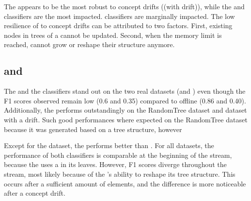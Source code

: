 
The \hoeffdingtree appears to be the most robust to concept drifts
(\banosdataset (with drift)), while the \mondrianforest and \naivebayes
classifiers are the most impacted. \mcnn classifiers are marginally impacted.
The low resilience of \mondrianforest to concept drifts can be attributed to
two factors. First, existing nodes in trees of a \mondrianforest cannot be updated.
Second, when the memory limit is reached, \mondriantrees cannot grow
or reshape their structure anymore.


\subsection{\hoeffdingtree and \naivebayes}

The \naivebayes and the \hoeffdingtree classifiers stand out on the two real datasets
(\banosdataset and \recofitdataset) even though the F1 scores observed remain
low (0.6 and 0.35) compared to offline \knn (0.86 and 0.40). Additionally, the
\hoeffdingtree performs outstandingly on the RandomTree dataset and
\banosdataset dataset with a drift. Such good performances where expected on the
RandomTree dataset because it was generated based on a tree structure, however

Except for the \banosdataset dataset, the \hoeffdingtree performs better
than \naivebayes. For all datasets, the performance of both classifiers is
comparable at the beginning of the stream, because the \hoeffdingtree uses
a \naivebayes in its leaves.  However, F1 scores diverge throughout the
stream, most likely because of the \hoeffdingtree's ability to reshape its
tree structure.  This occurs after a sufficient amount of elements, and the
difference is more noticeable after a concept drift.


